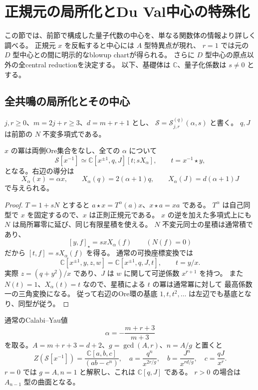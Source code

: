\section{正規元の局所化とDu Val中心の特殊化}
\label{sec:central-reductions-v35}

この節では、前節で構成した量子代数の中心を、単なる関数体の情報より詳しく調べる。
正規元 $x$ を反転すると中心には $A$ 型特異点が現れ、
$r=1$ では元の $D$ 型中心との間に明示的なblowup chartが得られる。
さらに $D$ 型中心の原点以外の全central reductionを決定する。
以下、基礎体は $\mathbb C$、量子化係数は $s\ne0$ とする。

\subsection{全共鳴の局所化とその中心}

$j,r\ge0$、$m=2j+r\ge3$、$d=m+r+1$ とし、
$\mathcal S=\mathcal S_{j,r}^{(q)}(\alpha,s)$ と書く。
$q,J$ は前節の $N$ 不変多項式である。

\begin{proposition}[Euler型の局所表示]
\label{prop:euler-localization-v35}
$x$ の冪は両側Ore集合をなし、全ての $\alpha$ について
\[
 \mathcal S[x^{-1}]
 \simeq \mathbb C[x^{\pm1},q,J][t;sX_\alpha],
 \qquad t=x^{-1}\star y,
\]
となる。右辺の導分は
\[
 X_\alpha(x)=\alpha x,\qquad
 X_\alpha(q)=2(\alpha+1)q,\qquad
 X_\alpha(J)=d(\alpha+1)J
\]
で与えられる。
\end{proposition}

\begin{proof}
$T=1+sN$ とすると
$a\star x=T^\alpha(a)x$、$x\star a=xa$ である。
$T^\alpha$ は自己同型で $x$ を固定するので、$x$ は正則正規元である。
$x$ の逆を加えた多項式上にも $N$ は局所冪零に延び、同じ有限星積を使える。
$N$ 不変元同士の星積は通常積であり、
\[
 [y,f]_\star=sxX_\alpha(f)\qquad(N(f)=0)
\]
だから $[t,f]=sX_\alpha(f)$ を得る。
通常の可換座標変換では
\[
 \mathbb C[x^{\pm1},y,z,w]
 =\mathbb C[x^{\pm1},q,J,t],\qquad t=y/x.
\]
実際 $z=(q+y^2)/x$ であり、$J$ は $w$ に関して可逆係数 $x^{r+1}$ を持つ。
また $N(t)=1$、$X_\alpha(t)=t$ なので、星積による $t$ の冪は通常冪に対して
最高係数一の三角変換になる。
従って右辺のOre環の基底 $1,t,t^2,\ldots$ は左辺でも基底となり、同型が従う。
\end{proof}

\begin{theorem}
\label{thm:localized-center-v35}
通常のCalabi--Yau値
\[
 \alpha=-\frac{m+r+3}{m+3}
\]
を取る。$A=m+r+3=d+2$、$g=\gcd(A,r)$、$n=A/g$ と置くと
\[
 \boxed{
 Z(\mathcal S[x^{-1}])
 =\frac{\mathbb C[a,b,c]}{(ab-c^n)},\quad
 a=\frac{q^n}{x^{2r/g}},\quad
 b=\frac{J^n}{x^{rd/g}},\quad
 c=\frac{qJ}{x^r}.
 }
\]
$r=0$ では $g=A,n=1$ と解釈し、これは $\mathbb C[q,J]$ である。
$r>0$ の場合は $A_{n-1}$ 型の曲面となる。
\end{theorem}

